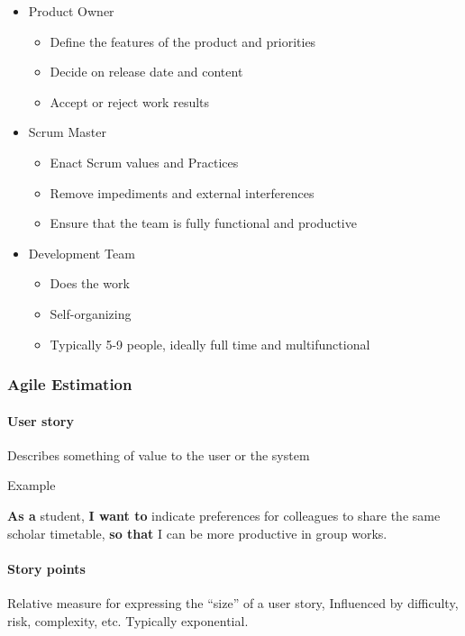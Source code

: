 \documentclass[../ESOF_notes.tex]{subfiles}
\begin{document}
\begin{itemize}
    \item Product Owner
    \begin{itemize}
        \item Define the features of the product and priorities
        \item Decide on release date and content
        \item Accept or reject work results
    \end{itemize}

    \item Scrum Master
    \begin{itemize}
        \item Enact Scrum values and Practices
        \item Remove impediments and external interferences
        \item Ensure that the team is fully functional and productive
    \end{itemize}
    
    \item Development Team
    \begin{itemize}
        \item Does the work
        \item Self-organizing
        \item Typically 5-9 people, ideally full time and multifunctional
    \end{itemize}
\end{itemize}

\subsubsection{Agile Estimation}
\paragraph{User story}
Describes something of value to the user or the system

Example

\textbf{As a} student, \textbf{I want to} indicate preferences for colleagues to share
the same scholar timetable, \textbf{so that} I can be more productive in group works.

\paragraph{Story points}

Relative measure for expressing the “size” of a user story, Influenced by difficulty, risk, complexity, etc.
Typically exponential.
\end{document}
